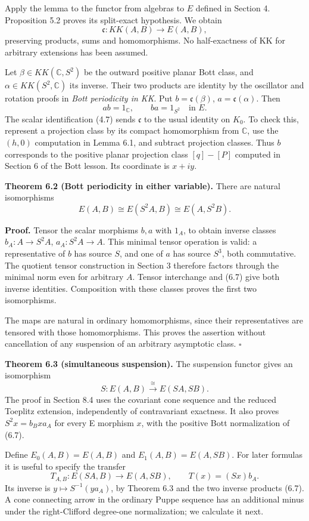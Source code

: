 \documentclass[
  11pt,
]{article}
\begin{document}
Apply the lemma to the functor from algebras to \(E\) defined in Section
4. Proposition 5.2 proves its split-exact hypothesis. We obtain \[
\mathfrak c:KK(A,B)\longrightarrow E(A,B),
\tag{6.6}
\] preserving products, sums and homomorphisms. No half-exactness of KK
for arbitrary extensions has been assumed.

Let \(\beta\in KK(\mathbb C,S^2)\) be the outward positive planar Bott
class, and \(\alpha\in KK(S^2,\mathbb C)\) its inverse. Their two
products are identity by the oscillator and rotation proofs in
\emph{Bott periodicity in KK}. Put \(b=\mathfrak c(\beta)\),
\(a=\mathfrak c(\alpha)\). Then \[
ab=1_{\mathbb C},\qquad ba=1_{S^2}
\quad\text{in }E.
\tag{6.7}
\] The scalar identification (4.7) sends \(\mathfrak c\) to the usual
identity on \(K_0\). To check this, represent a projection class by its
compact homomorphism from \(\mathbb C\), use the \((h,0)\) computation
in Lemma 6.1, and subtract projection classes. Thus \(b\) corresponds to
the positive planar projection class \([q]-[P]\) computed in Section 6
of the Bott lesson. Its coordinate is \(x+iy\).

\textbf{Theorem 6.2 (Bott periodicity in either variable).} There are
natural isomorphisms \[
E(A,B)\cong E(S^2A,B)\cong E(A,S^2B).
\tag{6.8}
\]

\textbf{Proof.} Tensor the scalar morphisms \(b,a\) with \(1_A\), to
obtain inverse classes \(b_A:A\to S^2A\), \(a_A:S^2A\to A\). This
minimal tensor operation is valid: a representative of \(b\) has source
\(S\), and one of \(a\) has source \(S^3\), both commutative. The
quotient tensor construction in Section 3 therefore factors through the
minimal norm even for arbitrary \(A\). Tensor interchange and (6.7) give
both inverse identities. Composition with these classes proves the first
two isomorphisms.

The maps are natural in ordinary homomorphisms, since their
representatives are tensored with those homomorphisms. This proves the
assertion without cancellation of any suspension of an arbitrary
asymptotic class. \(\square\)

\textbf{Theorem 6.3 (simultaneous suspension).} The suspension functor
gives an isomorphism \[
S:E(A,B)\overset\cong\longrightarrow E(SA,SB).
\tag{6.9}
\] The proof in Section 8.4 uses the covariant cone sequence and the
reduced Toeplitz extension, independently of contravariant exactness. It
also proves \(S^2x=b_Bxa_A\) for every E morphism \(x\), with the
positive Bott normalization of (6.7).

Define \(E_0(A,B)=E(A,B)\) and \(E_1(A,B)=E(A,SB)\). For later formulas
it is useful to specify the transfer \[
T_{A,B}:E(SA,B)\longrightarrow E(A,SB),
\qquad T(x)=(Sx)b_A.
\tag{6.10}
\] Its inverse is \(y\mapsto S^{-1}(ya_A)\), by Theorem 6.3 and the two
inverse products (6.7). A cone connecting arrow in the ordinary Puppe
sequence has an additional minus under the right-Clifford degree-one
normalization; we calculate it next.
\end{document}

